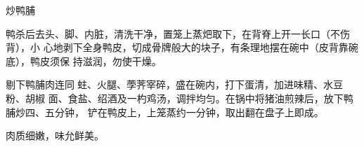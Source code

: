 %
%
%
%
%
%
%
\begin{recipe}{炒鸭脯}

\ingredients


\preparation

鸭杀后去头、脚、内脏，清洗干净，置笼上蒸𤆵取下，在背脊上开一长口（不伤背），小
心地剥下全身鸭皮，切成骨牌般大的块子，有条理地摆在碗中（皮背靠碗底），鸭皮须保
持滋润，勿使干燥。

剔下鸭脯肉连同𧎼蛀、火腿、荸荠宰碎，盛在碗内，打下蛋清，加进味精、水豆粉、胡椒
面、食盐、绍酒及一杓鸡汤，调拌均匀。在锅中将猪油煎辣后，放下鸭脯炒四、五分钟，
铲在鸭皮上，上笼蒸约一分钟，取出翻在盘子上即成。

\features

肉质细嫩，味允鲜美。

\end{recipe}


